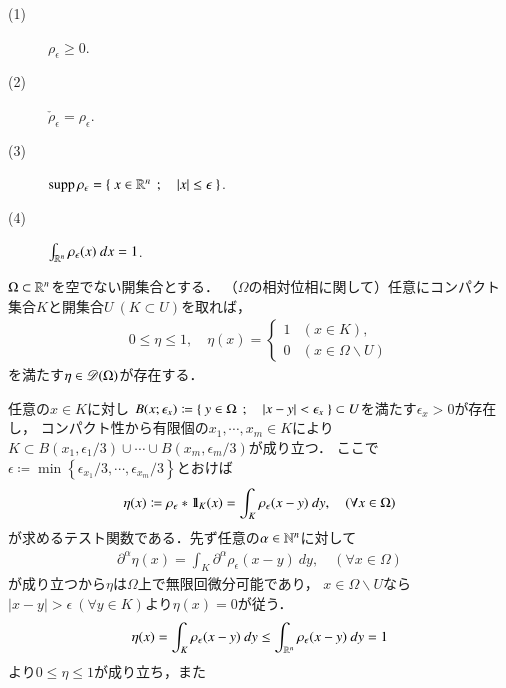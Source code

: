 	\begin{screen}
		\begin{thm}\mbox{}
			\begin{description}
				\item[(1)] $\rho_\epsilon \geq 0$.
				\item[(2)] $\check{\rho}_\epsilon = \rho_\epsilon$.
				\item[(3)] $\operatorname{supp} \rho_\epsilon = \left\{\ x \in \mathbb{R}^n\ \, ; \quad |x| \leq \epsilon\ \right\}$.
				\item[(4)] $\int_{\mathbb{R}^n} \rho_\epsilon(x)\ dx = 1$.
			\end{description}
		\end{thm}
	\end{screen}
	
	\begin{screen}
		\begin{thm}[任意の開集合上に台を持つテスト関数の構成]
			$\Omega \subset \mathbb{R}^n$を空でない開集合とする．
			（$\Omega$の相対位相に関して）任意にコンパクト集合$K$と開集合$U\ (K \subset U)$を取れば，
			\begin{align}
				0 \leq \eta \leq 1,
				\quad 
				\eta(x) =
				\begin{cases}
					1 & (x \in K), \\
					0 & (x \in \Omega \backslash U) 
				\end{cases}
			\end{align}
			を満たす$\eta \in \mathscr{D}(\Omega)$が存在する．
		\end{thm}
	\end{screen}
	
	\begin{prf}
		任意の$x \in K$に対し
		$B(x;\epsilon_x) \coloneqq \left\{\ y \in \Omega\ \, ; \quad |x-y| < \epsilon_x\ \right\} \subset U$を満たす$\epsilon_x > 0$が存在し，
		コンパクト性から有限個の$x_1,\cdots,x_m \in K$により$K \subset B(x_1,\epsilon_1/3) \cup \cdots \cup B(x_m,\epsilon_m/3)$が成り立つ．
		ここで$\epsilon \coloneqq \min{}{\left\{ \epsilon_{x_1}/3,\cdots,\epsilon_{x_m}/3 \right\}}$とおけば
		\begin{align}
			\eta(x) \coloneqq \rho_\epsilon \ast \mbox{1}\hspace{-0.25em}\mbox{l}_K(x) = \int_{K} \rho_\epsilon(x - y)\ dy,
			\quad (\forall x \in \Omega)
		\end{align}
		が求めるテスト関数である．先ず任意の$\alpha \in \mathbb{N}^n$に対して
		\begin{align}
			\partial^\alpha \eta(x) = \int_K \partial^\alpha \rho_\epsilon(x-y)\ dy,
			\quad (\forall x \in \Omega)
		\end{align}
		が成り立つから$\eta$は$\Omega$上で無限回微分可能であり，
		$x \in \Omega \backslash U$なら
		$|x - y| > \epsilon\ (\forall y \in K)$より$\eta(x) = 0$が従う．
		\begin{align}
			\eta(x) = \int_K \rho_\epsilon(x-y)\ dy \leq \int_{\mathbb{R}^n} \rho_\epsilon(x-y)\ dy = 1
		\end{align}
		より$0 \leq \eta \leq 1$が成り立ち，また
	\end{prf}